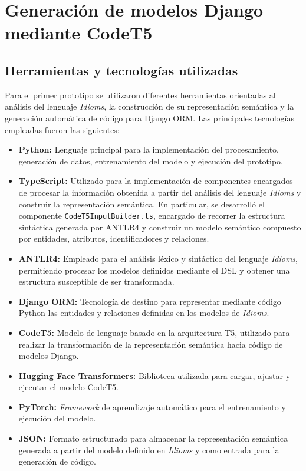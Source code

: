 \section{Generación de modelos Django mediante CodeT5}
\label{sec:primer-prototipo}

\subsection{Herramientas y tecnologías utilizadas}
\label{subsec:p1-herramientas}

Para el primer prototipo se utilizaron diferentes herramientas orientadas al análisis del lenguaje \textit{Idioms}, la construcción de su representación semántica y la generación automática de código para Django ORM. Las principales tecnologías empleadas fueron las siguientes:

\begin{itemize}
    \item \textbf{Python:} Lenguaje principal para la implementación del procesamiento, generación de datos, entrenamiento del modelo y ejecución del prototipo.
    \item \textbf{TypeScript:} Utilizado para la implementación de componentes encargados de procesar la información obtenida a partir del análisis del lenguaje \textit{Idioms} y construir la representación semántica. En particular, se desarrolló el componente \texttt{CodeT5InputBuilder.ts}, encargado de recorrer la estructura sintáctica generada por ANTLR4 y construir un modelo semántico compuesto por entidades, atributos, identificadores y relaciones.
    \item \textbf{ANTLR4:} Empleado para el análisis léxico y sintáctico del lenguaje \textit{Idioms}, permitiendo procesar los modelos definidos mediante el DSL y obtener una estructura susceptible de ser transformada.
    \item \textbf{Django ORM:} Tecnología de destino para representar mediante código Python las entidades y relaciones definidas en los modelos de \textit{Idioms}.
    \item \textbf{CodeT5:} Modelo de lenguaje basado en la arquitectura T5, utilizado para realizar la transformación de la representación semántica hacia código de modelos Django.
    \item \textbf{Hugging Face Transformers:} Biblioteca utilizada para cargar, ajustar y ejecutar el modelo CodeT5.
    \item \textbf{PyTorch:} \textit{Framework} de aprendizaje automático para el entrenamiento y ejecución del modelo.
    \item \textbf{JSON:} Formato estructurado para almacenar la representación semántica generada a partir del modelo definido en \textit{Idioms} y como entrada para la generación de código.
\end{itemize}

